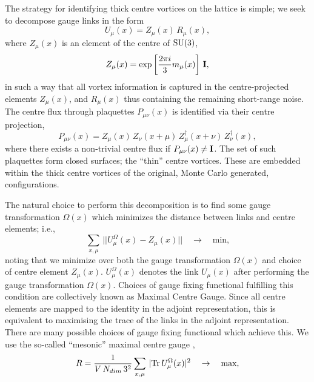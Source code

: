 \documentclass[
 reprint,
 amsmath,amssymb,
 aps,
prd,
]{revtex4-1}
\begin{document}
The strategy for identifying thick centre vortices on the lattice is simple; we seek to decompose gauge links in the form
\begin{equation}
U_{\mu}(x) = Z_{\mu}(x)\,R_{\mu}(x),
\end{equation}
where $Z_{\mu}(x)$ is an element of the centre of $\mathrm{SU}(3)$,
\begin{equation}
Z_{\mu}(x) = \exp \left[ \frac{2\pi i}{3}m_{\mu}(x) \right] \,{\bf I},
\end{equation}
in such a way that all vortex information is captured in the centre-projected elements $Z_{\mu}(x)$, and $R_{\mu}(x)$ thus containing the remaining short-range noise. The centre flux through plaquettes $P_{\mu\nu}(x)$ is identified via their centre projection,
\begin{equation}
P_{\mu\nu}(x) = Z_{\mu}(x)\,Z_{\nu}(x+\mu)\,Z_{\mu}^{\dagger}(x+\nu)\,Z_{\nu}^{\dagger}(x),
\end{equation}
where there exists a non-trivial centre flux if $P_{\mu\nu}(x) \neq {\bf I}$. The set of such plaquettes form closed surfaces; the ``thin'' centre vortices. These are embedded within the thick centre vortices of the original, Monte Carlo generated, configurations. \par
The natural choice \cite{DelDebbio:1998uu} to perform this decomposition is to find some gauge transformation $\Omega(x)$ which minimizes the distance between links and centre elements; i.e.,
\begin{equation}
\sum_{x,\mu}\,||U_{\mu}^{\Omega}(x) - Z_{\mu}(x)|| \quad \rightarrow \quad \textrm{min,}
\end{equation}
noting that we minimize over both the gauge transformation $\Omega(x)$ and choice of centre element $Z_{\mu}(x)$. $U_{\mu}^{\Omega}(x)$ denotes the link $U_{\mu}(x)$ after performing the gauge transformation $\Omega(x)$. Choices of gauge fixing functional fulfilling this condition are collectively known as Maximal Centre Gauge. Since all centre elements are mapped to the identity in the adjoint representation, this is equivalent to maximising the trace of the links in the adjoint representation. There are many possible choices \cite{DelDebbio:1998uu,DelDebbio:1996mh,Vink:1992ys,Vink:1994rb,Alexandrou:1999vx,Faber:2001zs,Montero:1999by} of gauge fixing functional which achieve this. We use the so-called ``mesonic'' maximal centre gauge \cite{Montero:1999by},
\begin{equation}
R = \frac{1}{V\,N_{dim}\,3^{2}}\sum_{x,\mu}\,|\mathrm{Tr} \, U_{\mu}^{\Omega}(x)|^{2} \quad \rightarrow \quad \textrm{max},
\end{equation}
\end{document}
